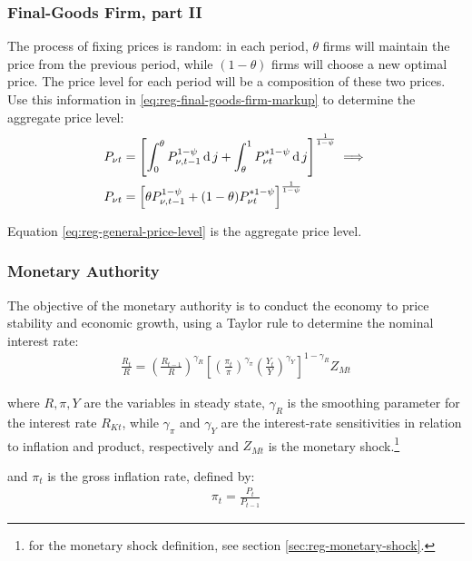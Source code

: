 \documentclass[
thesis.tex
]{subfiles}
\begin{document}
\subsubsection*{Final-Goods Firm, part II}

The process of fixing prices is random: in each period, $\theta$ firms will maintain the price from the previous period, while $(1-\theta)$ firms will choose a new optimal price. The price level for each period will be a composition of these two prices. Use this information in \ref{eq:reg-final-goods-firm-markup} to determine the aggregate price level:
\begin{align}
	P_{\nu t} & = \left[ \int_{0}^{\theta} P_{\nu, t-1}^{1-\psi} \operatorname{d} j + \int_{\theta}^{1} P_{\nu t}^{\ast 1-\psi} \operatorname{d} j \right]^{\frac{1}{1-\psi}}  \implies \nonumber \\
	P_{\nu t} & = \left[ \theta P_{\nu, t-1}^{1-\psi} + (1-\theta) P_{\nu t}^{\ast 1-\psi} \right]^\frac{1}{1-\psi} \label{eq:reg-general-price-level}
\end{align}

Equation \ref{eq:reg-general-price-level} is the aggregate price level.


\subsubsection{Monetary Authority}

The objective of the monetary authority is to conduct the economy to price stability and economic growth, using a Taylor rule \cite{taylor_discretion_1993} to determine the nominal interest rate:
\begin{align}
	\label{eq:reg-monetary-policy}
	\frac{R_{t}}{R} =
	\left( \frac{R_{t-1}}{R} \right)^{\gamma_R}  \left[
	\left( \frac{\pi_t}{\pi} \right)^{\gamma_\pi}
	\left( \frac{Y_t}{Y} \right)^{\gamma_Y} \right]^{1-\gamma_R} Z_{Mt}
\end{align}

where $R, \pi, Y$ are the variables in steady state, $\gamma_R$ is the smoothing parameter for the interest rate $R_{Kt}$, while $\gamma_\pi$ and $\gamma_Y$ are the interest-rate sensitivities in relation to inflation and product, respectively and $Z_{Mt}$ is the monetary shock.\footnote{for the monetary shock definition, see section \ref{sec:reg-monetary-shock}.}

and $\pi_t$ is the gross inflation rate, defined by:
\begin{align}
	\pi_t = \frac{P_t}{P_{t-1}}
	\label{eq:reg-gross-inflation-rate}
\end{align}
\end{document}
